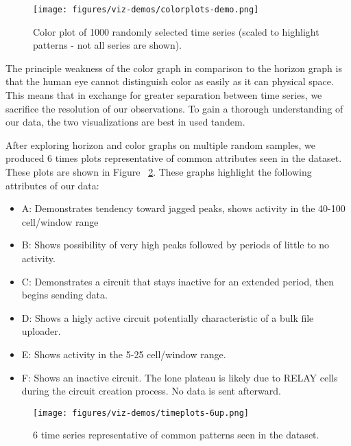 \begin{figure}
	\centerline{\texttt{[image: figures/viz-demos/colorplots-demo.png]}}
	\caption{Color plot of 1000 randomly selected time series (scaled to highlight patterns - not all series are shown).}
	\label{fig:colorplots}
\end{figure}

The principle weakness of the color graph in comparison to the horizon graph is that the human eye cannot distinguish color as easily as it can physical space. This means that in exchange for greater separation between time series, we sacrifice the resolution of our observations. To gain a thorough understanding of our data, the two visualizations are best in used tandem.

After exploring horizon and color graphs on multiple random samples, we produced 6 times plots representative of common attributes seen in the dataset. These plots are shown in Figure ~\ref{fig:timeplots}. These graphs highlight the following attributes of our data:

\begin{itemize}
	\item A: Demonstrates tendency toward jagged peaks, shows activity in the 40-100 cell/window range
	\item B: Shows possibility of very high peaks followed by periods of little to no activity.
	\item C: Demonstrates a circuit that stays inactive for an extended period, then begins sending data.
	\item D: Shows a higly active circuit potentially characteristic of a bulk file uploader.
	\item E: Shows activity in the 5-25 cell/window range.
	\item F: Shows an inactive circuit. The lone plateau is likely due to RELAY cells during the circuit creation process. No data is sent afterward.
\end{itemize}

\begin{figure}
	\centerline{\texttt{[image: figures/viz-demos/timeplots-6up.png]}}
	\caption{6 time series representative of common patterns seen in the dataset.}
	\label{fig:timeplots}
\end{figure}

